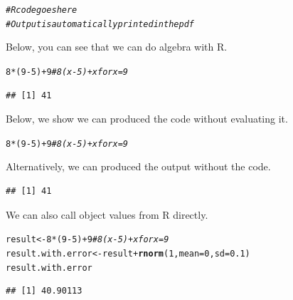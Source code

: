 \documentclass{article}\usepackage[]{graphicx}\usepackage[]{xcolor}
\makeatletter
\newcommand{\hlnum}[1]{\textcolor[rgb]{0.686,0.059,0.569}{#1}}%
\newcommand{\hlcom}[1]{\textcolor[rgb]{0.678,0.584,0.686}{\textit{#1}}}%
\newcommand{\hlopt}[1]{\textcolor[rgb]{0,0,0}{#1}}%
\newcommand{\hldef}[1]{\textcolor[rgb]{0.345,0.345,0.345}{#1}}%
\newcommand{\hlkwb}[1]{\textcolor[rgb]{0.69,0.353,0.396}{#1}}%
\newcommand{\hlkwc}[1]{\textcolor[rgb]{0.333,0.667,0.333}{#1}}%
\newcommand{\hlkwd}[1]{\textcolor[rgb]{0.737,0.353,0.396}{\textbf{#1}}}%
\newenvironment{kframe}{%
 \def\at@end@of@kframe{}%
 \ifinner\ifhmode%
  \def\at@end@of@kframe{\end{minipage}}%
  \begin{minipage}{\columnwidth}%
 \fi\fi%
 \def\FrameCommand##1{\hskip\@totalleftmargin \hskip-\fboxsep
 \colorbox{shadecolor}{##1}\hskip-\fboxsep
     \hskip-\linewidth \hskip-\@totalleftmargin \hskip\columnwidth}%
 \MakeFramed {\advance\hsize-\width
   \@totalleftmargin\z@ \linewidth\hsize
   \@setminipage}}%
 {\par\unskip\endMakeFramed%
 \at@end@of@kframe}
\newenvironment{knitrout}{}{} %
\makeatother
\begin{document}
\begin{multicols}{2}
\begin{knitrout}\scriptsize
{}\color{fgcolor}\begin{kframe}
\begin{alltt}
\hlcom{# R code goes here}
\hlcom{# Output is automatically printed in the pdf}
\end{alltt}
\end{kframe}
\end{knitrout}
Below, you can see that we can do algebra with R.
\begin{knitrout}\scriptsize
{}\color{fgcolor}\begin{kframe}
\begin{alltt}
\hlnum{8}\hlopt{*}\hldef{(}\hlnum{9}\hlopt{-}\hlnum{5}\hldef{)} \hlopt{+} \hlnum{9}   \hlcom{# 8(x-5) + x for x=9}
\end{alltt}
\begin{verbatim}
## [1] 41
\end{verbatim}
\end{kframe}
\end{knitrout}
Below, we show we can produced the code without evaluating it.
\begin{knitrout}\scriptsize
{}\color{fgcolor}\begin{kframe}
\begin{alltt}
\hlnum{8}\hlopt{*}\hldef{(}\hlnum{9}\hlopt{-}\hlnum{5}\hldef{)} \hlopt{+} \hlnum{9}   \hlcom{# 8(x-5) + x for x=9}
\end{alltt}
\end{kframe}
\end{knitrout}
Alternatively, we can produced the output without the code.
\begin{knitrout}\scriptsize
{}\color{fgcolor}\begin{kframe}
\begin{verbatim}
## [1] 41
\end{verbatim}
\end{kframe}
\end{knitrout}

We can also call object values from R directly.
\begin{knitrout}\scriptsize
{}\color{fgcolor}\begin{kframe}
\begin{alltt}
\hldef{result} \hlkwb{<-}  \hlnum{8}\hlopt{*}\hldef{(}\hlnum{9}\hlopt{-}\hlnum{5}\hldef{)} \hlopt{+} \hlnum{9}   \hlcom{# 8(x-5) + x for x = 9}
\hldef{result.with.error} \hlkwb{<-} \hldef{result} \hlopt{+} \hlkwd{rnorm}\hldef{(}\hlnum{1}\hldef{,} \hlkwc{mean} \hldef{=} \hlnum{0}\hldef{,} \hlkwc{sd} \hldef{=} \hlnum{0.1}\hldef{)}
\hldef{result.with.error}
\end{alltt}
\begin{verbatim}
## [1] 40.90113
\end{verbatim}
\end{kframe}
\end{knitrout}


\end{multicols}
\end{document}

